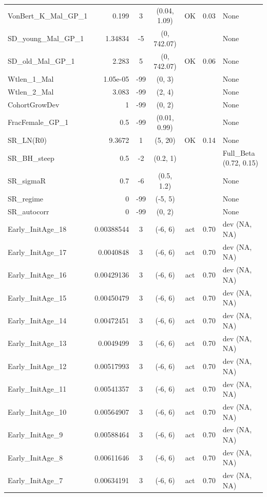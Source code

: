 \documentclass[12pt,]{article}
\begin{document}
\begin{landscape}
\begin{longtable}{lrcccll}
  VonBert\_K\_Mal\_GP\_1 & 0.199 & 3 & (0.04, 1.09) & OK & 0.03 & None \\ 
  SD\_young\_Mal\_GP\_1 & 1.34834 & -5 & (0, 742.07) &  &  & None \\ 
  SD\_old\_Mal\_GP\_1 & 2.283 & 5 & (0, 742.07) & OK & 0.06 & None \\ 
  Wtlen\_1\_Mal & 1.05e-05 & -99 & (0, 3) &  &  & None \\ 
  Wtlen\_2\_Mal & 3.083 & -99 & (2, 4) &  &  & None \\ 
  CohortGrowDev & 1 & -99 & (0, 2) &  &  & None \\ 
  FracFemale\_GP\_1 & 0.5 & -99 & (0.01, 0.99) &  &  & None \\ 
  SR\_LN(R0) & 9.3672 & 1 & (5, 20) & OK & 0.14 & None \\ 
  SR\_BH\_steep & 0.5 & -2 & (0.2, 1) &  &  & Full\_Beta (0.72, 0.15) \\ 
  SR\_sigmaR & 0.7 & -6 & (0.5, 1.2) &  &  & None \\ 
  SR\_regime & 0 & -99 & (-5, 5) &  &  & None \\ 
  SR\_autocorr & 0 & -99 & (0, 2) &  &  & None \\ 
  Early\_InitAge\_18 & 0.00388544 & 3 & (-6, 6) & act & 0.70 & dev (NA, NA) \\ 
  Early\_InitAge\_17 & 0.0040848 & 3 & (-6, 6) & act & 0.70 & dev (NA, NA) \\ 
  Early\_InitAge\_16 & 0.00429136 & 3 & (-6, 6) & act & 0.70 & dev (NA, NA) \\ 
  Early\_InitAge\_15 & 0.00450479 & 3 & (-6, 6) & act & 0.70 & dev (NA, NA) \\ 
  Early\_InitAge\_14 & 0.00472451 & 3 & (-6, 6) & act & 0.70 & dev (NA, NA) \\ 
  Early\_InitAge\_13 & 0.0049499 & 3 & (-6, 6) & act & 0.70 & dev (NA, NA) \\ 
  Early\_InitAge\_12 & 0.00517993 & 3 & (-6, 6) & act & 0.70 & dev (NA, NA) \\ 
  Early\_InitAge\_11 & 0.00541357 & 3 & (-6, 6) & act & 0.70 & dev (NA, NA) \\ 
  Early\_InitAge\_10 & 0.00564907 & 3 & (-6, 6) & act & 0.70 & dev (NA, NA) \\ 
  Early\_InitAge\_9 & 0.00588464 & 3 & (-6, 6) & act & 0.70 & dev (NA, NA) \\ 
  Early\_InitAge\_8 & 0.00611646 & 3 & (-6, 6) & act & 0.70 & dev (NA, NA) \\ 
  Early\_InitAge\_7 & 0.00634191 & 3 & (-6, 6) & act & 0.70 & dev (NA, NA) \\ 

\end{longtable}
\end{landscape}
\end{document}
